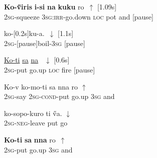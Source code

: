 \documentclass[output=paper]{LSP/langsci}
\begin{document}
 \begin{exe}
 \label{Guapp13}
\gll      \textbf{Ko-\H{v}iris}          \textbf{i-si}                 \textbf{na}   \textbf{kuku} ro~$\uparrow$  [1.09s]\\     	       
   \textsc{2sg}-squeeze     \textsc{3sg:irr-}go.down   \textsc{loc}  pot  and [pause]\\
\glt {} 
\end{exe}


  \begin{exe}
 \label{Guapp14}
\gll  ko-[0.2s]ku-a.~$\downarrow$  [1.1s]  \\     	       
\textsc{2sg}-[pause]boil-\textsc{3sg} [pause] \\
\glt {} 
\end{exe}

  \begin{exe}
 \label{Guapp15}
\gll  \underline{Ko-ti}       \underline{sa}     \underline{na}  \underline{}~$\downarrow$  [0.6s]  \\     	       
\textsc{2sg}-put   go.up   \textsc{loc}  fire [pause] \\
\glt {} 
\end{exe}

  \begin{exe}
 \label{Guapp16}
\gll  Ko-v      ko-mo-ti          sa      nna   ro $\uparrow$   \\     	       
\textsc{2sg}-say \textsc{2sg-cond}-put   go.up   \textsc{3sg}   and  \\
\glt {} 
\end{exe}

  \begin{exe}
 \label{Guapp17}
\gll  ko-sopo-kuro    ti    \H{v}a. $\downarrow$   \\     	       
\textsc{2sg-neg}-leave   put   go  \\
\glt {} 
\end{exe}


  \begin{exe}
 \label{Guapp18}
\gll  \textbf{Ko-ti}       \textbf{sa}     \textbf{nna}  ro~$\uparrow$  \\     	       
\textsc{2sg}-put   go.up    \textsc{3sg}   and  \\
\glt {} 
\end{exe}
\end{document}
